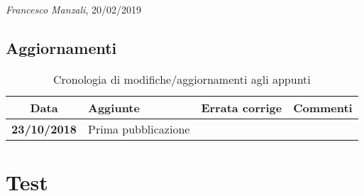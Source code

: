 \documentclass[12pt]{report} %
\theoremstyle{plain}
\theoremstyle{definition}
\theoremstyle{remark}
\begin{document}
\begin{flushright}
\textit{Francesco Manzali}, 20/02/2019
\end{flushright}
\clearpage
\section*{Aggiornamenti}
\begin{table}[hb]
    \centering
    \begin{tabular}{|cm{3cm}m{5cm}m{3cm}|}\toprule
        Data & Aggiunte & Errata corrige & Commenti\\\midrule
        \textbf{23/10/2018} & Prima pubblicazione & & \\
        \bottomrule
    \end{tabular}
    \caption{Cronologia di modifiche/aggiornamenti agli appunti}
    \label{updates}
\end{table}

\clearpage

\chapter{Test}




\clearpage
\begin{thebibliography}{9}

\end{thebibliography}

\printindex
\end{document}
